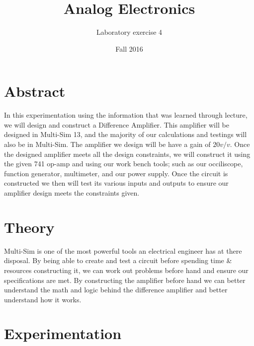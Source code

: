\documentclass[12pt]{article}
\begin{document}
\title{Analog Electronics}
\author{Laboratory exercise 4}
\date{Fall 2016}
\maketitle

\newpage
\section{Abstract}

In this experimentation using the information that was learned through lecture, we will design and construct a Difference Amplifier. This amplifier will be designed in Multi-Sim 13, and the majority of our calculations and testings will also be in Multi-Sim. The amplifier we design will be have a gain of $20v/v$. Once the designed amplifier meets all the design constraints, we will construct it using the given 741 op-amp and using our work bench tools; such as our occiliscope, function generator, multimeter, and our power supply. Once the circuit is constructed we then will test its various inputs and outputs to ensure our amplifier design meets the constraints given.

\section{Theory}

Multi-Sim is one of the most powerful tools an electrical engineer has at there disposal. By being able to create and test a circuit before spending time \& resources constructing it, we can work out problems before hand and ensure our specifications are met. By constructing the amplifier before hand  we can better understand the math and logic behind the difference amplifier and better understand how it works.

\newpage

\section{Experimentation}
\end{document}
